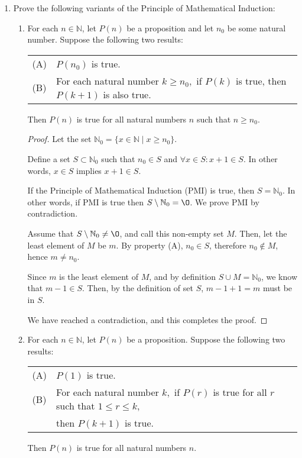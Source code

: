 \documentclass[11pt]{article}
\newcommand{\bbN}{\mathbb{N}}
\renewcommand{\emptyset}{\O}
\begin{document}
 \begin{enumerate}
 

\item Prove the following variants of the Principle of Mathematical Induction:
\begin{enumerate}
\item For each $n\in {\mathbb N}$, let $P(n)$ be a proposition and let $n_0$ be some natural number. 
Suppose the following two results:
\begin{center}
\begin{tabular}{ll}
(A) & $P(n_0)$ is true. \\
(B) & For each natural number $k\geq n_0,$ if $P(k)$ is true, then $P(k+1)$ is also true. \\
\end{tabular}
\end{center}
Then $P(n)$ is true for all natural numbers $n$ such that $n\geq n_0.$

\begin{proof}
Let the set $\bbN_0 = \{x \in \bbN \mid x \geq n_0\}$.

Define a set $S \subset \bbN_0$ such that $n_0 \in S$ and $\forall x \in S: x+1 \in S$. In other words, $x \in S$ implies $x+1 \in S$. 

If the Principle of Mathematical Induction (PMI) is true, then $S = \bbN_0$. In other words, if PMI is true then $S \setminus \bbN_0 = \emptyset$. We prove PMI by contradiction.

Assume that $S \setminus \bbN_0 \not= \emptyset$, and call this non-empty set $M$. Then, let the least element of $M$ be $m$. By property (A), $n_0 \in S$, therefore $n_0 \notin M$, hence $m \not = n_0$.

Since $m$ is the least element of $M$, and by definition $S \cup M = \bbN_0$, we know that $m-1 \in S$. Then, by the definition of set $S$, $m-1+1 = m$ must be in $S$.

We have reached a contradiction, and this completes the proof.

\renewcommand\qedsymbol{QED}

\end{proof}

\item 
For each $n\in {\mathbb N}$, let $P(n)$ be a proposition. 
Suppose the following two results:
\begin{center}
\begin{tabular}{ll}
(A) & $P(1)$ is true. \\
(B) & For each natural number $k,$ if $P(r)$ is true for all $r$ such that $1\leq r\leq k$, \\  & then $P(k+1)$ is true.
\end{tabular}
\end{center}
Then $P(n)$ is true for all natural numbers $n.$


\end{enumerate}
\end{enumerate}
\end{document}
